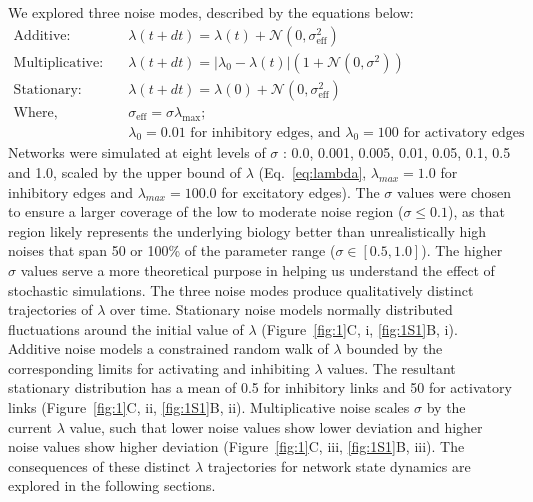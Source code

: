 \documentclass[11pt]{article}
\begin{document}
We explored three noise modes, described by the equations below: 
\begin{equation}
\begin{aligned}
\text{Additive:} \quad & \lambda(t+dt) = \lambda(t) + \mathcal{N}(0, \sigma_{\text{eff}}^2) \\
\text{Multiplicative:} \quad & \lambda(t+dt) = |\lambda_0 - \lambda(t)|\left(1 + \mathcal{N}(0, \sigma^2)\right) \\
\text{Stationary:} \quad & \lambda(t+dt) = \lambda(0) + \mathcal{N}(0, \sigma_{\text{eff}}^2) \\
\text{Where,} \quad & \sigma_{\text{eff}} = \sigma\lambda_{\text{max}}\text{;} \\
& \lambda_0 = 0.01 \text{ for inhibitory edges, and } \lambda_0 = 100 \text{ for activatory edges}
\end{aligned}
\label{eq:lambda}
\end{equation}
Networks were simulated at eight levels of $\sigma$ : 0.0, 0.001, 0.005, 0.01, 0.05, 0.1, 0.5 and 1.0, scaled by the upper bound of $\lambda$ (Eq.~\ref{eq:lambda}, $\lambda_{max} = 1.0$ for inhibitory edges and $\lambda_{max} = 100.0$ for excitatory edges). The $\sigma$ values were chosen to ensure a larger coverage of the low to moderate noise region ($\sigma \leq 0.1$), as that region likely represents the underlying biology better than unrealistically high noises that span 50 or 100\% of the parameter range ($\sigma \in [0.5, 1.0]$). The higher $\sigma$ values serve a more theoretical purpose in helping us understand the effect of stochastic simulations. The three noise modes produce qualitatively distinct trajectories of $\lambda$ over time. Stationary noise models normally distributed fluctuations around the initial value of $\lambda$ (Figure~\ref{fig:1}C, i, \ref{fig:1S1}B, i). Additive noise models a constrained random walk of $\lambda$ bounded by the corresponding limits for activating and inhibiting $\lambda$ values. The resultant stationary distribution has a mean of 0.5 for inhibitory links and 50 for activatory links (Figure~\ref{fig:1}C, ii, \ref{fig:1S1}B, ii). Multiplicative noise scales $\sigma$ by the current $\lambda$ value, such that lower noise values show lower deviation and higher noise values show higher deviation (Figure~\ref{fig:1}C, iii, \ref{fig:1S1}B, iii). The consequences of these distinct $\lambda$ trajectories for network state dynamics are explored in the following sections.
\end{document}
